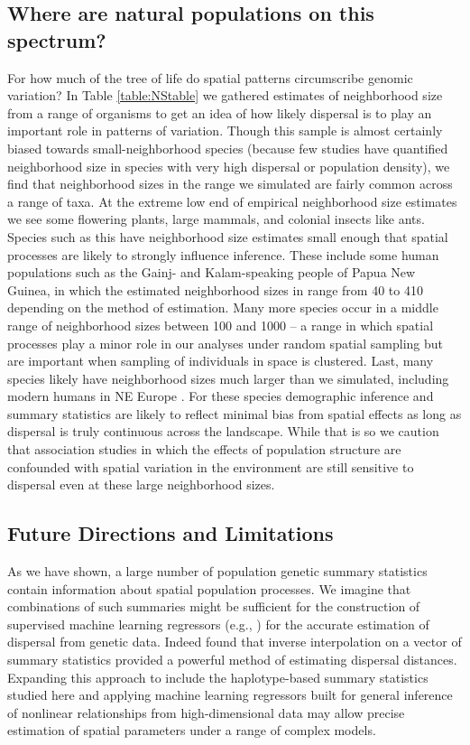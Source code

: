 \documentclass[11pt,twoside,lineno]{preprint}
\begin{document}
\subsection{Where are natural populations on this spectrum?}
For how much of the tree of life do spatial patterns circumscribe genomic variation? In Table \ref{table:NStable} we gathered estimates of neighborhood size from a range of organisms to get an idea of how likely dispersal is to play an important role in patterns of variation. Though this sample is almost certainly biased towards small-neighborhood species (because few studies have quantified neighborhood size in species with very high dispersal or population density), we find that neighborhood sizes in the range we simulated are fairly common across a range of taxa. At the extreme low end of empirical neighborhood size estimates we see some flowering plants, large mammals, and colonial insects like ants. Species such as this have neighborhood size estimates small enough that spatial processes are likely to strongly influence inference. These include some human populations such as the Gainj- and Kalam-speaking people of Papua New Guinea, in which the estimated neighborhood sizes in \citep{Rousset1997} range from 40 to 410 depending on the method of estimation. Many more species occur in a middle range of neighborhood sizes between 100 and 1000 -- a range in which spatial processes play a minor role in our analyses under random spatial sampling but are important when sampling of individuals in space is clustered. Last, many species likely have neighborhood sizes much larger than we simulated, including modern humans in NE Europe \citep{Ringbauer2017}. For these species demographic inference and summary statistics are likely to reflect minimal bias from spatial effects as long as dispersal is truly continuous across the landscape. While that is so we caution that association studies in which the effects of population structure are confounded with spatial variation in the environment are still sensitive to dispersal even at these large neighborhood sizes.

\subsection{Future Directions and Limitations}
As we have shown, a large number of population genetic summary statistics contain information about spatial population processes. We imagine that combinations of such summaries might be sufficient for the construction of supervised machine learning regressors (e.g., \cite{Schrider2018}) for the accurate estimation of dispersal from genetic data. Indeed \cite{Ashander2018} found that inverse interpolation on a vector of summary statistics provided a powerful method of estimating dispersal distances. Expanding this approach to include the haplotype-based summary statistics studied here and applying machine learning regressors built for general inference of nonlinear relationships from high-dimensional data may allow precise estimation of spatial parameters under a range of complex models. 
\end{document}
